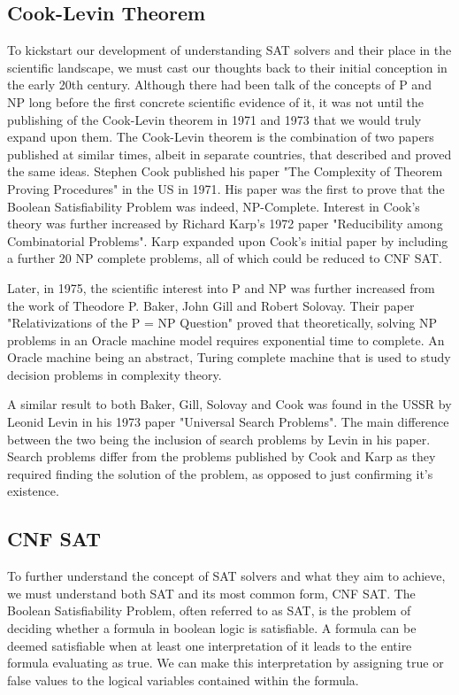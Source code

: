 \documentclass{article}
\begin{document}
\subsection{Cook-Levin Theorem}
To kickstart our development of understanding SAT solvers and their place in the scientific landscape, we must cast our thoughts back to their
initial conception in the early 20th century. Although there had been talk of the concepts of P and NP long before the first concrete
scientific evidence of it, it was not until the publishing of the Cook-Levin theorem in 1971 and 1973 that we would truly expand upon them.
The Cook-Levin theorem is the combination of two papers published at similar times, albeit in separate countries, that described and proved
the same ideas. Stephen Cook published his paper "The Complexity of Theorem Proving Procedures" in the US in 1971\cite{scook}. His paper was the
first to prove that the Boolean Satisfiability Problem was indeed, NP-Complete. Interest in Cook's theory was further increased by Richard
Karp's 1972 paper "Reducibility among Combinatorial Problems"\cite{karp}. Karp expanded upon Cook's initial paper by including a further 20 NP complete
problems, all of which could be reduced to CNF SAT.

Later, in 1975, the scientific interest into P and NP was further increased from the work of Theodore P. Baker, John Gill and Robert
Solovay. Their paper "Relativizations of the P = NP Question" proved that theoretically, solving NP problems in an Oracle machine model
requires exponential time to complete\cite{pnp}. An Oracle machine being an abstract, Turing complete machine that is used to study decision
problems in complexity theory.

A similar result to both Baker, Gill, Solovay and Cook was found in the USSR by Leonid Levin in his 1973 paper "Universal Search
Problems"\cite{levin}. The main difference between the two being the inclusion of search problems by Levin in his paper. Search problems differ from
the problems published by Cook and Karp as they required finding the solution of the problem, as opposed to just confirming it's
existence.

\subsection{CNF SAT}
To further understand the concept of SAT solvers and what they aim to achieve, we must understand both SAT and its most common form, CNF
SAT. The Boolean Satisfiability Problem, often referred to as SAT, is the problem of deciding whether a formula in boolean logic is
satisfiable. A formula can be deemed satisfiable when at least one interpretation of it leads to the entire formula evaluating as true. We
can make this interpretation by assigning true or false values to the logical variables contained within the formula.
\end{document}
